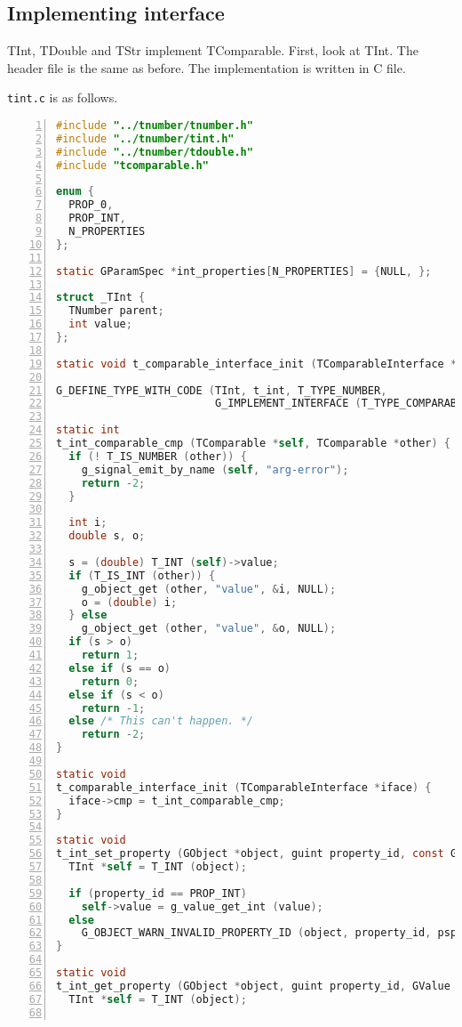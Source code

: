 \subsection{Implementing interface}\label{implementing-interface}

TInt, TDouble and TStr implement TComparable. First, look at TInt. The
header file is the same as before. The implementation is written in C
file.

\passthrough{\lstinline!tint.c!} is as follows.

\begin{lstlisting}[language=C, numbers=left]
#include "../tnumber/tnumber.h"
#include "../tnumber/tint.h"
#include "../tnumber/tdouble.h"
#include "tcomparable.h"

enum {
  PROP_0,
  PROP_INT,
  N_PROPERTIES
};

static GParamSpec *int_properties[N_PROPERTIES] = {NULL, };

struct _TInt {
  TNumber parent;
  int value;
};

static void t_comparable_interface_init (TComparableInterface *iface);

G_DEFINE_TYPE_WITH_CODE (TInt, t_int, T_TYPE_NUMBER,
                         G_IMPLEMENT_INTERFACE (T_TYPE_COMPARABLE, t_comparable_interface_init))

static int
t_int_comparable_cmp (TComparable *self, TComparable *other) {
  if (! T_IS_NUMBER (other)) {
    g_signal_emit_by_name (self, "arg-error");
    return -2;
  }

  int i;
  double s, o;

  s = (double) T_INT (self)->value;
  if (T_IS_INT (other)) {
    g_object_get (other, "value", &i, NULL);
    o = (double) i;
  } else
    g_object_get (other, "value", &o, NULL);
  if (s > o)
    return 1;
  else if (s == o)
    return 0;
  else if (s < o)
    return -1;
  else /* This can't happen. */
    return -2;
}

static void
t_comparable_interface_init (TComparableInterface *iface) {
  iface->cmp = t_int_comparable_cmp;
}

static void
t_int_set_property (GObject *object, guint property_id, const GValue *value, GParamSpec *pspec) {
  TInt *self = T_INT (object);

  if (property_id == PROP_INT)
    self->value = g_value_get_int (value);
  else
    G_OBJECT_WARN_INVALID_PROPERTY_ID (object, property_id, pspec);
}

static void
t_int_get_property (GObject *object, guint property_id, GValue *value, GParamSpec *pspec) {
  TInt *self = T_INT (object);


\end{lstlisting}
